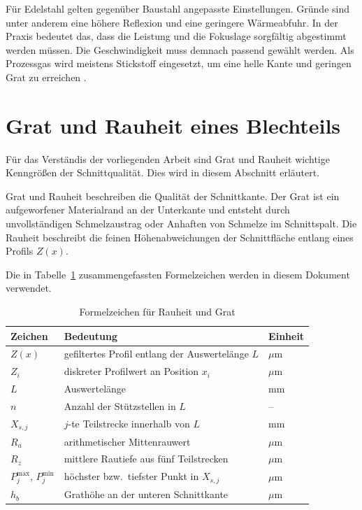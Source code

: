 Für Edelstahl gelten gegenüber Baustahl angepasste Einstellungen. Gründe sind unter anderem eine höhere Reflexion und eine geringere Wärmeabfuhr. In der Praxis bedeutet das, dass die Leistung und die Fokuslage sorgfältig abgestimmt werden müssen. Die Geschwindigkeit muss demnach passend gewählt werden. Als Prozessgas wird meistens Stickstoff eingesetzt, um eine helle Kante und geringen Grat zu erreichen \parencite{TRUMPF_FusionCutting}.

\section{Grat und Rauheit eines Blechteils}
\label{sec:grat-rauheit}

Für das Verständis der vorliegenden Arbeit sind Grat und Rauheit wichtige Kenngrößen der Schnittqualität. Dies wird in diesem Abschnitt erläutert.

Grat und Rauheit beschreiben die Qualität der Schnittkante. Der Grat ist ein aufgeworfener Materialrand an der Unterkante und entsteht durch unvollständigen Schmelzaustrag oder Anhaften von Schmelze im Schnittspalt. Die Rauheit beschreibt die feinen Höhenabweichungen der Schnittfläche entlang eines Profils \(Z(x)\).

Die in Tabelle~\ref{tab:symbole-rauheit-grat} zusammengefassten Formelzeichen werden in diesem Dokument verwendet.
\begin{table}[htbp]
  \centering
  \caption{Formelzeichen für Rauheit und Grat}
  \label{tab:symbole-rauheit-grat}
  \begin{tabular}{@{}lll@{}}
    \toprule
    Zeichen & Bedeutung & Einheit \\
    \midrule
    $Z(x)$      & gefiltertes Profil entlang der Auswertelänge $L$ & $\mu$m \\
    $Z_i$       & diskreter Profilwert an Position $x_i$            & $\mu$m \\
    $L$         & Auswertelänge                                      & mm \\
    $n$         & Anzahl der Stützstellen in $L$                     & -- \\
    $X_{s,j}$   & $j$-te Teilstrecke innerhalb von $L$               & mm \\
    $R_a$       & arithmetischer Mittenrauwert                       & $\mu$m \\
    $R_z$       & mittlere Rautiefe aus fünf Teilstrecken            & $\mu$m \\
    $P^{\max}_{j}$, $P^{\min}_{j}$ & höchster bzw.\ tiefster Punkt in $X_{s,j}$ & $\mu$m \\
    $h_b$       & Grathöhe an der unteren Schnittkante               & $\mu$m \\
    \bottomrule
  \end{tabular}
\end{table}

